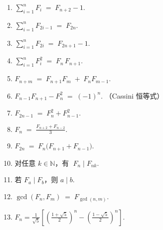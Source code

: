 \begin{enumerate}
  \item \(\displaystyle \sum_{i=1}^{n} F_i \;=\; F_{n+2}-1.\)

  \item \(\displaystyle \sum_{i=1}^{n} F_{2i-1} \;=\; F_{2n}.\)

  \item \(\displaystyle \sum_{i=1}^{n} F_{2i} \;=\; F_{2n+1}-1.\)

  \item \(\displaystyle \sum_{i=1}^{n} F_i^{2} \;=\; F_n\,F_{n+1}.\)

  \item \(\displaystyle F_{n+m} \;=\; F_{n+1}F_m \;+\; F_nF_{m-1}.\)

  \item \(\displaystyle F_{n-1}F_{n+1}-F_n^{2} \;=\; (-1)^{n}.\) \hfill（Cassini 恒等式）

  \item \(\displaystyle F_{2n-1} \;=\; F_{n}^{2}+F_{n-1}^{2}.\)

  \item \(\displaystyle F_{n} \;=\; \frac{F_{n+2}+F_{n-2}}{3}.\)

  \item \(\displaystyle F_{2n} \;=\; F_n\bigl(F_{n+1}+F_{n-1}\bigr).\)

  \item 对任意 \(k\in\mathbb{N}\)，有 \(\;F_n \mid F_{nk}\).

  \item 若 \(F_a \mid F_b\)，则 \(a\mid b\).

  \item \(\displaystyle \gcd(F_n,F_m) \;=\; F_{\gcd(n,m)}.\)

  \item \(\displaystyle F_n = \frac{1}{\sqrt{5}} \left[ \left( \frac{1+\sqrt{5}}{2} \right)^n - \left( \frac{1-\sqrt{5}}{2} \right)^n \right].\)
\end{enumerate}
